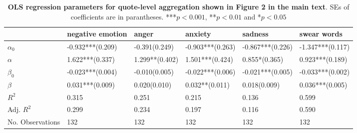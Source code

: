 \begin{table}[h]\centering
\caption{\textbf{OLS regression parameters for  quote-level aggregation shown in Figure 2 in the main text}. SEs of coefficients are in parantheses. ***$p < 0.001$, **$p < 0.01$ and *$p < 0.05$}
	\label{fig: Quotation_1}
\begin{adjustbox}{width=\linewidth, center}
	\begin{tabular}{llllll}
	\toprule
	{} &            negative emotion &                                                     anger &                               anxiety &                                                   sadness &                 swear words \\
	\midrule
	$\alpha_0$       &            -0.932***(0.209) &            -0.391\phantom{*}\phantom{*}\phantom{*}(0.249) &                      -0.903***(0.263) &                                          -0.867***(0.226) &            -1.347***(0.117) \\
	$\alpha$         &  \phantom{-}1.622***(0.337) &                      \phantom{-}1.299**\phantom{*}(0.402) &            \phantom{-}1.501***(0.424) &            \phantom{-}0.855*\phantom{*}\phantom{*}(0.365) &  \phantom{-}0.923***(0.189) \\
	$\beta_0$        &            -0.023***(0.004) &            -0.010\phantom{*}\phantom{*}\phantom{*}(0.005) &                      -0.022***(0.006) &                                          -0.021***(0.005) &            -0.033***(0.002) \\
	$\beta$          &  \phantom{-}0.031***(0.009) &  \phantom{-}0.020\phantom{*}\phantom{*}\phantom{*}(0.010) &  \phantom{-}0.032**\phantom{*}(0.011) &  \phantom{-}0.018\phantom{*}\phantom{*}\phantom{*}(0.009) &  \phantom{-}0.036***(0.005) \\
	$R^2$            &                       0.315 &                                                     0.251 &                                 0.215 &                                                     0.136 &                       0.599 \\
	Adj. $R^2$       &                       0.299 &                                                     0.234 &                                 0.197 &                                                     0.116 &                       0.590 \\
	No. Observations &                         132 &                                                       132 &                                   132 &                                                       132 &                         132 \\
	\bottomrule
	\end{tabular}
	
\end{adjustbox}
	\end{table}

